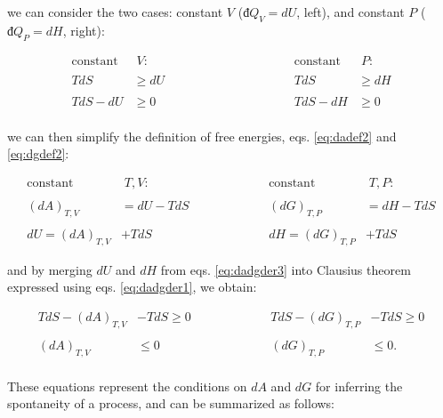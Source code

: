 \documentclass[
  9pt,
]{extbook}
\theoremstyle{definition}
\theoremstyle{definition}
\theoremstyle{definition}
\theoremstyle{remark}
\begin{document}
we can consider the two cases: constant \(V\) (\(đQ_V=dU\), left), and constant \(P\) (\(đQ_P=dH\), right):

\begin{equation}
\begin{aligned}
\text{constant} & \; V:           & \qquad \qquad & \qquad \qquad &     \text{constant} & \; P: \\
\\
TdS & \geq dU           & &   &     TdS & \geq dH \\
\\
TdS -dU & \geq 0         & &   &      TdS -dH & \geq 0 \\
\end{aligned}
\label{eq:dadgder1}
\end{equation}

we can then simplify the definition of free energies, eqs. \eqref{eq:dadef2} and \eqref{eq:dgdef2}:

\begin{equation}
\begin{aligned}
\text{constant} & \; T,V:           & \qquad & \qquad &     \text{constant} & \; T,P: \\
\\
(dA)_{T,V} &= dU -TdS     & &   &       (dG)_{T,P} &= dH - TdS \\ 
\\
dU = (dA)_{T,V} &+TdS       & &   &       dH = (dG)_{T,P} &+TdS
\end{aligned}
\label{eq:dadgder3}
\end{equation}

and by merging \(dU\) and \(dH\) from eqs. \eqref{eq:dadgder3} into Clausius theorem expressed using eqs. \eqref{eq:dadgder1}, we obtain:

\begin{equation}
\begin{aligned}
TdS -(dA)_{T,V} &- TdS \geq 0 & \qquad & \qquad & TdS -(dG)_{T,P} &- TdS \geq 0 \\
\\
(dA)_{T,V} & \leq 0 & \qquad & \qquad & (dG)_{T,P} & \leq 0. \\
\end{aligned}
\label{eq:dadgcond}
\end{equation}

These equations represent the conditions on \(dA\) and \(dG\) for inferring the spontaneity of a process, and can be summarized as follows:
\end{document}
